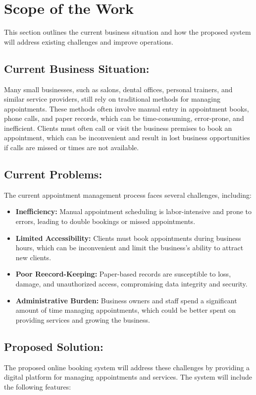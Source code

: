 \section{Scope of the Work}
\label{sec:scope-of-the-work}
This section outlines the current business situation and how the proposed system will address existing challenges and improve operations.

\subsection*{Current Business Situation:}
\label{subsec:current-business-situation}
Many small businesses, such as salons, dental offices, personal trainers, and similar service providers, still rely on traditional methods for managing appointments. These methods often involve manual entry in appointment books, phone calls, and paper records, which can be time-consuming, error-prone, and inefficient. Clients must often call or visit the business premises to book an appointment, which can be inconvenient and result in lost business opportunities if calls are missed or times are not available.

\subsection*{Current Problems:}
\label{subsec:current-problems}
The current appointment management process faces several challenges, including:
\begin{itemize}
    \item \textbf{Inefficiency:} Manual appointment scheduling is labor-intensive and prone to errors, leading to double bookings or missed appointments.
    \item \textbf{Limited Accessibility:} Clients must book appointments during business hours, which can be inconvenient and limit the business's ability to attract new clients.
    \item \textbf{Poor Reecord-Keeping:} Paper-based records are susceptible to loss, damage, and unauthorized access, compromising data integrity and security.
    \item \textbf{Administrative Burden:} Business owners and staff spend a significant amount of time managing appointments, which could be better spent on providing services and growing the business.
\end{itemize}

\subsection*{Proposed Solution:}
\label{subsec:proposed-solution}
The proposed online booking system will address these challenges by providing a digital platform for managing appointments and services. The system will include the following features:

